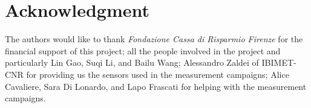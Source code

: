 \documentclass[journal]{IEEEtran}
\begin{document}
\section*{Acknowledgment}
The authors would like to thank \textit{Fondazione Cassa di Risparmio Firenze} for the financial support of this project;
all the people involved in the project and particularly Lin Gao, Suqi Li, and Bailu Wang; Alessandro Zaldei of IBIMET-CNR
for providing us the sensors used in the measurement campaigns; Alice Cavaliere, Sara Di Lonardo, and Lapo Frascati for helping with the measurement campaigns.




\ifCLASSOPTIONcaptionsoff
  \newpage
\fi




\end{document}
